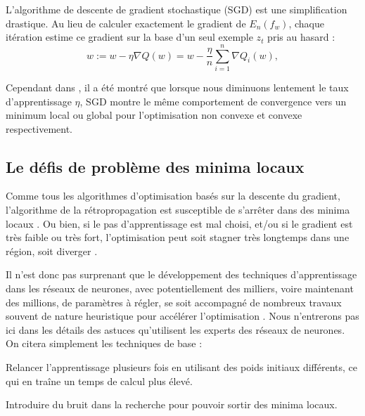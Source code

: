 	L'algorithme de descente de gradient stochastique (SGD) est une simplification drastique. Au lieu de calculer exactement le gradient de $E_n (f_w )$, chaque itération estime ce gradient sur la base d'un seul exemple $z_t$ pris au hasard \cite{bottou2012stochastic} :
	$$
	{\displaystyle w:=w-\eta \nabla Q(w)=w-{\frac {\eta }{n}}\sum _{i=1}^{n}\nabla Q_{i}(w),}
	$$
	
	Cependant dans \cite{ruder2016overview}, il a été montré que lorsque nous diminuons lentement le taux d'apprentissage $\eta $, SGD montre le même comportement de convergence vers un minimum local ou global pour l'optimisation non convexe et convexe respectivement.
	
	
	

	\subsection{Le défis de problème des minima locaux} 
	
	Comme tous les algorithmes d'optimisation basés sur la descente du gradient, l'algorithme de la rétropropagation est susceptible de s'arrêter dans des minima locaux \cite{bosman2020visualising}. Ou bien, si le pas d'apprentissage est mal choisi, et/ou si le gradient est très faible ou très fort, l'optimisation peut soit stagner très longtemps dans une région, soit diverger \cite{antoine2018apprentissage,ml2008python}.
	
	Il n'est donc pas surprenant que le développement des techniques d'apprentissage dans les réseaux de neurones, avec potentiellement des milliers, voire maintenant des millions, de paramètres à régler, se soit accompagné de nombreux travaux souvent de nature heuristique pour accélérer l'optimisation \cite{antoine2018apprentissage}. Nous n'entrerons pas ici dans les détails des astuces qu'utilisent les experts des réseaux de neurones. On citera simplement les techniques de base :
	
	\begin{list}{--}{}
		\item Relancer l'apprentissage plusieurs fois en utilisant des poids initiaux différents, ce qui en traîne un temps de calcul plus élevé.
		\item Introduire du bruit dans la recherche pour pouvoir sortir des minima locaux.
	\end{list}

	
